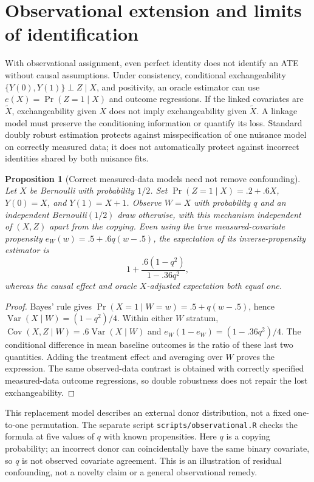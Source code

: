 \documentclass[11pt]{article}
\newtheorem{proposition}{Proposition}
\newcommand{\V}{\operatorname{Var}}
\newcommand{\Cov}{\operatorname{Cov}}
\begin{document}
\section{Observational extension and limits of identification}
With observational assignment, even perfect identity does not identify an ATE without
causal assumptions. Under consistency, conditional exchangeability
$\{Y(0),Y(1)\}\perp Z\mid X$, and positivity, an oracle estimator can use
$e(X)=\Pr(Z=1\mid X)$ and outcome regressions. If the linked covariates are
$\widetilde X$, exchangeability given $X$ does not imply exchangeability given
$\widetilde X$. A linkage model must preserve the conditioning information or quantify
its loss. Standard doubly robust estimation protects against misspecification of one
nuisance model on correctly measured data; it does not automatically protect against
incorrect identities shared by both nuisance fits.

\begin{proposition}[Correct measured-data models need not remove confounding]
Let $X$ be Bernoulli with probability $1/2$. Set
$\Pr(Z=1\mid X)=.2+.6X$, $Y(0)=X$, and $Y(1)=X+1$. Observe $W=X$ with probability $q$ and an
independent Bernoulli$(1/2)$ draw otherwise, with this mechanism independent of
$(X,Z)$ apart from the copying. Even using the true measured-covariate propensity
$e_W(w)=.5+.6q(w-.5)$, the expectation of its inverse-propensity estimator is
\[
 1+\frac{.6(1-q^2)}{1-.36q^2},
\]
whereas the causal effect and oracle $X$-adjusted expectation both equal one.
\end{proposition}
\begin{proof}
Bayes' rule gives $\Pr(X=1\mid W=w)=.5+q(w-.5)$, hence
$\V(X\mid W)=(1-q^2)/4$. Within either $W$ stratum,
$\Cov(X,Z\mid W)=.6\V(X\mid W)$ and
$e_W(1-e_W)=(1-.36q^2)/4$. The conditional difference in mean baseline outcomes
is the ratio of these last two quantities. Adding the treatment effect and averaging
over $W$ proves the expression. The same observed-data contrast is obtained with
correctly specified measured-data outcome regressions, so double robustness does not
repair the lost exchangeability.
\end{proof}
This replacement model describes an external donor distribution, not a fixed
one-to-one permutation. The separate script \texttt{scripts/observational.R}
checks the formula at five values of $q$ with known propensities. Here $q$ is a
copying probability; an incorrect donor can coincidentally have the same binary
covariate, so $q$ is not observed covariate agreement. This is an illustration of
residual confounding, not a novelty claim or a general observational remedy.
\end{document}
